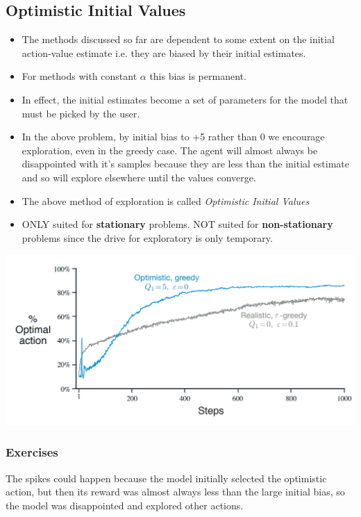\subsection{Optimistic Initial Values}
\begin{itemize}
\item The methods discussed so far are dependent to some extent on the initial action-value
    estimate i.e. they are biased by their initial estimates.
\item For methods with constant $\alpha$ this bias is permanent.
\item In effect, the initial estimates become a set of parameters for the model that must be
    picked by the user.
\item In the above problem, by initial bias to +5 rather than 0 we encourage exploration, even in the greedy case. The agent will almost always be disappointed with it's
    samples because they are less than the initial estimate and so will explore elsewhere until
    the values converge.
\item The above method of exploration is called \textit{Optimistic Initial Values}
\item ONLY suited for \textbf{stationary} problems. NOT suited for \textbf{non-stationary} problems since the drive for exploratory is only temporary.
\end{itemize}

\includegraphics[scale=0.35]{./optimistic_initial_value_graph.png}


\subsubsection{Exercises}
{
The spikes could happen because the model initially selected the optimistic action, but then its reward was almost always less than the large initial bias, so 
the model was disappointed and explored other actions. 
}


